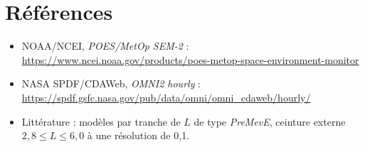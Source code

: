 \documentclass[11pt,a4paper]{article}
\begin{document}
\section*{Références}
\small
\begin{itemize}\setlength{\itemsep}{0pt}
  \item NOAA/NCEI, \emph{POES/MetOp SEM-2} : \url{https://www.ncei.noaa.gov/products/poes-metop-space-environment-monitor}
  \item NASA SPDF/CDAWeb, \emph{OMNI2 hourly} : \url{https://spdf.gsfc.nasa.gov/pub/data/omni/omni_cdaweb/hourly/}
  \item Littérature : modèles par tranche de $L$ de type \emph{PreMevE}, ceinture externe
        $2{,}8 \le L \le 6{,}0$ à une résolution de 0,1.
\end{itemize}
\end{document}
